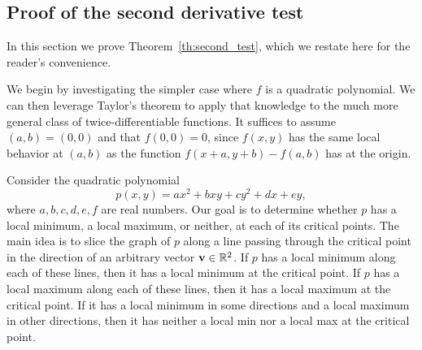 \documentclass{watsonbook}
\begin{document}
\newpage

\subsection{Proof of the second derivative test} \label{sec:proof_sdt}

In this section we prove Theorem~\ref{th:second_test}, which we
restate here for the reader's convenience.

\begin{theo}{}{}
  \secondderivativetest
\end{theo}

\begin{pf}
  We begin by investigating the simpler case where $f$ is a quadratic
  polynomial. We can then leverage Taylor's theorem to apply that
  knowledge to the much more general class of twice-differentiable
  functions. It suffices to assume $(a,b) = (0,0)$ and that
  $f(0,0) = 0$, since $f(x,y)$ has the same local behavior at $(a,b)$
  as the function $f(x+a, y+b)-f(a,b)$ has at the origin.
  
  Consider the quadratic polynomial 
  \[
    p(x,y) = ax^2  + b xy + cy^2 + dx + ey, 
  \]
  where $a,b,c,d,e,f$ are real numbers.  Our goal is to determine
  whether $p$ has a local minimum, a local maximum, or neither, at
  each of its critical points. The main idea is to slice the graph of
  $p$ along a line passing through the critical point in the direction
  of an arbitrary vector $\mathbf{v} \in \mathbb{R}^2$. If $p$ has a local
  minimum along each of these lines, then it has a local minimum at
  the critical point.  If $p$ has a local maximum along each of these
  lines, then it has a local maximum at the critical point. If it has
  a local minimum in some directions and a local maximum in other
  directions, then it has neither a local min nor a local max at the
  critical point.
  

\end{pf}
\end{document}
